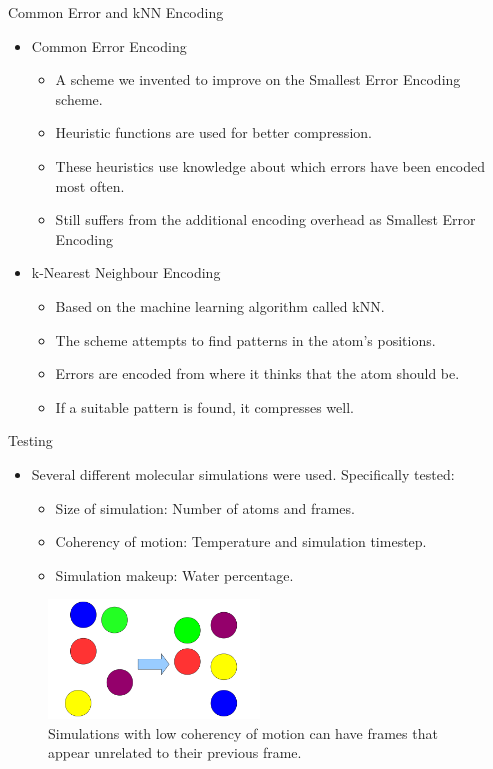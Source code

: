 \documentclass{beamer}
\begin{document}
\begin{frame}{Common Error and kNN Encoding}

\begin{itemize}
 \item Common Error Encoding
\begin{itemize}
 \item A scheme we invented to improve on the Smallest Error Encoding scheme.
 \item Heuristic functions are used for better compression.
 \item These heuristics use knowledge about which errors have been encoded most often.
 \item Still suffers from the additional encoding overhead as Smallest Error Encoding
\end{itemize}

\item k-Nearest Neighbour Encoding
\begin{itemize}
 \item Based on the machine learning algorithm called kNN.
 \item The scheme attempts to find patterns in the atom's positions.
 \item Errors are encoded from where it thinks that the atom should be.
 \item If a suitable pattern is found, it compresses well.
\end{itemize}
\end{itemize}
\end{frame}

\begin{frame}{Testing}
\begin{itemize}
 \item Several different molecular simulations were used. Specifically tested:
 \begin{itemize}
   \item Size of simulation: Number of atoms and frames.
   \item Coherency of motion: Temperature and simulation timestep.
   \item Simulation makeup: Water percentage.
 \end{itemize}
 \end{itemize}
\begin{figure}[h]
    \centering \includegraphics[width=0.5\textwidth]{julian-images/coherency.png}
  \caption{Simulations with low coherency of motion can have frames that appear unrelated to their previous frame.}
  \end{figure}
\end{frame}
\end{document}
